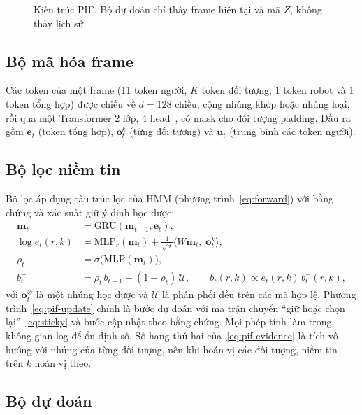 \begin{figure}[H]
  \centering
  \fitfig{}
  \caption{Kiến trúc PIF. Bộ dự đoán chỉ thấy frame hiện tại và mã $Z$, không thấy lịch sử}
  \label{fig:pif-arch}
\end{figure}

\subsection{Bộ mã hóa frame}

Các token của một frame (11 token người, $K$ token đối tượng, 1 token robot và 1 token tổng hợp) được chiếu về $d=128$ chiều, cộng nhúng khớp hoặc nhúng loại, rồi qua một Transformer 2 lớp, 4 head~\cite{vaswani2017attention}, có mask cho đối tượng padding. Đầu ra gồm $\mathbf{e}_t$ (token tổng hợp), $\mathbf{o}^k_t$ (từng đối tượng) và $\mathbf{u}_t$ (trung bình các token người).

\subsection{Bộ lọc niềm tin}

Bộ lọc áp dụng cấu trúc lọc của HMM (phương trình~\eqref{eq:forward}) với bằng chứng và xác suất giữ ý định học được:
\begin{align}
  \mathbf{m}_t &= \mathrm{GRU}(\mathbf{m}_{t-1},\mathbf{e}_t), \label{eq:pif-gru}\\
  \log e_t(r,k) &= \mathrm{MLP}_r(\mathbf{m}_t)+\tfrac{1}{\sqrt d}\big\langle W\mathbf{m}_t,\;\mathbf{o}^k_t\big\rangle, \label{eq:pif-evidence}\\
  \rho_t &= \sigma\big(\mathrm{MLP}(\mathbf{m}_t)\big), \label{eq:pif-keep}\\
  b^-_t &= \rho_t\, b_{t-1}+(1-\rho_t)\,\mathcal{U}, \qquad b_t(r,k)\propto e_t(r,k)\,b^-_t(r,k), \label{eq:pif-update}
\end{align}
với $\mathbf{o}^{\varnothing}_t$ là một nhúng học được và $\mathcal{U}$ là phân phối đều trên các mã hợp lệ. Phương trình~\eqref{eq:pif-update} chính là bước dự đoán với ma trận chuyển ``giữ hoặc chọn lại''~\eqref{eq:sticky} và bước cập nhật theo bằng chứng. Mọi phép tính làm trong không gian log để ổn định số. Số hạng thứ hai của~\eqref{eq:pif-evidence} là tích vô hướng với nhúng của từng đối tượng, nên khi hoán vị các đối tượng, niềm tin trên $k$ hoán vị theo.

\subsection{Bộ dự đoán}

